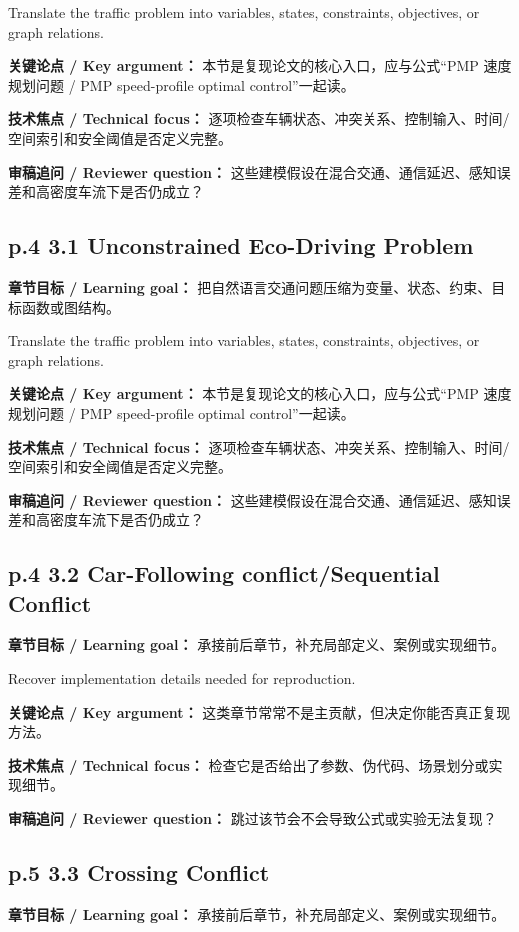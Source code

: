 \documentclass[UTF8,a4paper,11pt,fontset=fandol]{ctexart}
\begin{document}
Translate the traffic problem into variables, states, constraints, objectives, or graph relations.

\textbf{关键论点 / Key argument：} 本节是复现论文的核心入口，应与公式“PMP 速度规划问题 / PMP speed-profile optimal control”一起读。

\textbf{技术焦点 / Technical focus：} 逐项检查车辆状态、冲突关系、控制输入、时间/空间索引和安全阈值是否定义完整。

\textbf{审稿追问 / Reviewer question：} 这些建模假设在混合交通、通信延迟、感知误差和高密度车流下是否仍成立？

\subsection*{p.4 3.1 Unconstrained Eco-Driving Problem}
\textbf{章节目标 / Learning goal：} 把自然语言交通问题压缩为变量、状态、约束、目标函数或图结构。

Translate the traffic problem into variables, states, constraints, objectives, or graph relations.

\textbf{关键论点 / Key argument：} 本节是复现论文的核心入口，应与公式“PMP 速度规划问题 / PMP speed-profile optimal control”一起读。

\textbf{技术焦点 / Technical focus：} 逐项检查车辆状态、冲突关系、控制输入、时间/空间索引和安全阈值是否定义完整。

\textbf{审稿追问 / Reviewer question：} 这些建模假设在混合交通、通信延迟、感知误差和高密度车流下是否仍成立？

\subsection*{p.4 3.2 Car-Following conﬂict/Sequential Conﬂict}
\textbf{章节目标 / Learning goal：} 承接前后章节，补充局部定义、案例或实现细节。

Recover implementation details needed for reproduction.

\textbf{关键论点 / Key argument：} 这类章节常常不是主贡献，但决定你能否真正复现方法。

\textbf{技术焦点 / Technical focus：} 检查它是否给出了参数、伪代码、场景划分或实现细节。

\textbf{审稿追问 / Reviewer question：} 跳过该节会不会导致公式或实验无法复现？

\subsection*{p.5 3.3 Crossing Conﬂict}
\textbf{章节目标 / Learning goal：} 承接前后章节，补充局部定义、案例或实现细节。
\end{document}
